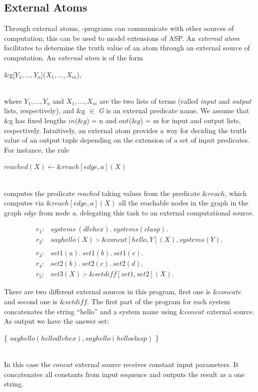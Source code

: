\documentclass[a4paper, titlepage]{article}
\newcommand{\ext}[3]{\ensuremath{\&{#1}[#2](#3)}}
\DeclareMathOperator{\leftimpl}{:-}
\begin{document}
\subsection{External Atoms}
\label{extatoms}
Through external atoms, \hex{}-programs can communicate 
with other sources of computation; this can be used to 
model extensions of ASP.  
An \emph{external atom} facilitates to determine the truth 
value of an atom through an external source of computation.
An \emph{external atom} is of the form \\ \centerline{ 
\&g[$Y_1,\dots,Y_n$]($X_1,\dots,X_m$),} \\where $Y_1,
\dots,Y_n$ and $X_1,\dots,X_m$ are the two lists of terms 
(called \textit{input} and \textit{output} lists, 
respectively), and \&g $\in$ \textit{G} is an external 
predicate name. We assume that \&g has fixed lengths 
$in$($\&g$) = n and $out$($\&g$) = m for 
input and output lists, respectively. Intuitively, an 
external atom provides a way for deciding the truth value 
of an output tuple depending on the extension of a set of 
input predicates.
For instance, the rule \\ \centerline{ \textit{$reached(X) 
\leftarrow \&reach[edge,a](X)$}}
\\computes the predicate \textit{reached} taking values 
from the predicate $\&reach$, which computes via 
\textit{$\&reach[edge,a](X)$} all the reachable nodes in 
the graph in the graph \textit{edge} from node \textit{a}, 
delegating this task to an external computational source.
\begin{exmp}
\begin{align*}
r_1\colon& \mathit{systems} \ (\mathit{dlvhex}). \ 
\mathit{systems}(\mathit{clasp}). \\  
r_2\colon& \mathit{sayhello(X)} \leftimpl 
\ext{\mathit{concat}}{\mathit{hello, Y}}{\mathit{X}}, 
\mathit{systems(Y).}  \\ 
\\
r_3\colon& \mathit{set1}(a). \ \mathit{set1}(b). \ 
\mathit{set1}(c).\\
r_4\colon& \mathit{set2}(b). \ \mathit{set2}(c). \ 
\mathit{set2}(d).\\
r_5\colon& \mathit{set3}(X) \leftimpl 
\ext{\mathit{setdiff}}{\mathit{set1, set2}}{\mathit{X}}. 
\end{align*}
\end{exmp}

There are two different external sources in this program, 
first one is $\mathit{\&concate}$ and second one is 
$\mathit{\&setdiff}$. The first part of the program for each 
system concatenates the string \enquote{hello} and a system 
name using $\mathit{\&concat}$ external source. As output 
we have the answer set:\\ 
\centerline{ \{ $\mathit{sayhello}(\mathit{hellodlvhex}), 
\mathit{sayhello}(\mathit{helloclasp})$ \}}
\\In this case the $\mathit{concat}$ external source receives 
constant input parameters. It concatenates all constants from input sequence and outputs the result as a one string.
\end{document}
